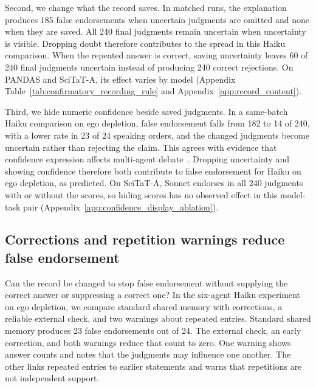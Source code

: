 \documentclass{article} %
\begin{document}
Second, we change what the record saves. In matched runs, the explanation produces 185 false endorsements when uncertain judgments are omitted and none when they are saved. All 240 final judgments remain uncertain when uncertainty is visible. Dropping doubt therefore contributes to the spread in this Haiku comparison. When the repeated answer is correct, saving uncertainty leaves 60 of 240 final judgments uncertain instead of producing 240 correct rejections. On PANDAS and SciTaT-A, its effect varies by model (Appendix Table~\ref{tab:confirmatory_recording_rule} and Appendix~\ref{app:record_content}).

Third, we hide numeric confidence beside saved judgments. In a same-batch Haiku comparison on ego depletion, false endorsement falls from 182 to 14 of 240, with a lower rate in 23 of 24 speaking orders, and the changed judgments become uncertain rather than rejecting the claim. This agrees with evidence that confidence expression affects multi-agent debate~\citep{lin2025confidence}. Dropping uncertainty and showing confidence therefore both contribute to false endorsement for Haiku on ego depletion, as predicted. On SciTaT-A, Sonnet endorses in all 240 judgments with or without the scores, so hiding scores has no observed effect in this model-task pair (Appendix~\ref{app:confidence_display_ablation}).

\subsection{Corrections and repetition warnings reduce false endorsement}
\label{sec:mitigations}

Can the record be changed to stop false endorsement without supplying the correct answer or suppressing a correct one? In the six-agent Haiku experiment on ego depletion, we compare standard shared memory with corrections, a reliable external check, and two warnings about repeated entries. Standard shared memory produces 23 false endorsements out of 24. The external check, an early correction, and both warnings reduce that count to zero. One warning shows answer counts and notes that the judgments may influence one another. The other links repeated entries to earlier statements and warns that repetitions are not independent support.
\end{document}
